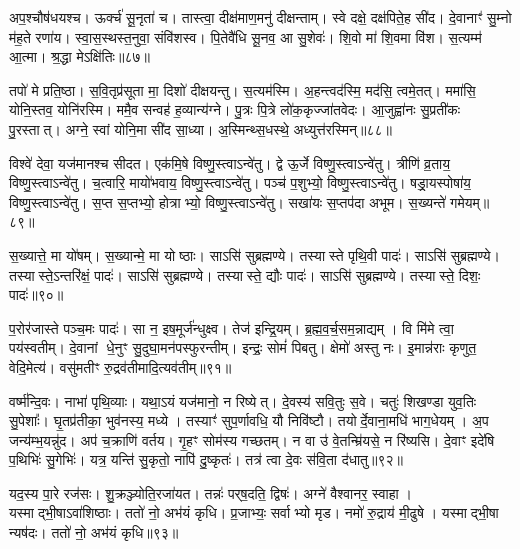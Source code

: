 अप॒श्चौष॑धयश्च।
ऊर्क्च॑ सू॒नृता॑ च।
तास्त्वा॒ दीक्ष॑माण॒मनु॑ दीक्षन्ताम्।
स्वे दक्षे॒ दक्ष॑पिते॒ह सी॑द।
दे॒वानाꣳ॑ सु॒म्नो म॑ह॒ते रणा॑य।
स्वा॒स॒स्थस्त॒नुवा॒ संवि॑शस्व।
पि॒तेवै॑धि सू॒नव॒ आ सु॒शेवः॑।
शि॒वो मा॑ शि॒वमा वि॑श।
स॒त्यम्म॑ आ॒त्मा।
श्र॒द्धा मेऽक्षि॑तिः॥८७॥

तपो॑ मे प्रति॒ष्ठा।
स॒वि॒तृप्र॑सूता मा॒ दिशो॑ दीक्षयन्तु।
स॒त्यम॑स्मि।
अ॒हन्त्वद॑स्मि॒ मद॑सि॒ त्वमे॒तत्।
ममा॑सि॒ योनि॒स्तव॒ योनि॑रस्मि।
ममै॒व सन्वह॑ ह॒व्यान्य॑ग्ने।
पु॒त्रः पि॒त्रे लो॑क॒कृज्जा॑तवेदः।
आ॒जुह्वा॑नः सु॒प्रती॑कः पु॒रस्तात्।
अग्ने॒ स्वां योनि॒मा सी॑द सा॒ध्या।
अ॒स्मिन्थ्स॒धस्थे॒ अध्युत्त॑रस्मिन्॥८८॥

विश्वे॑ देवा॒ यज॑मानश्च सीदत।
एक॑मि॒षे विष्णु॒स्त्वा\-ऽन्वे॑तु।
द्वे ऊ॒र्जे विष्णु॒स्त्वा\-ऽन्वे॑तु।
त्रीणि॑ व्र॒ताय॒ विष्णु॒स्त्वा\-ऽन्वे॑तु।
च॒त्वारि॒ मायो॑भवाय॒ विष्णु॒स्त्वा\-ऽन्वे॑तु।
पञ्च॑ प॒शुभ्यो॒ विष्णु॒स्त्वा\-ऽन्वे॑तु।
षड्रा॒यस्पोषा॑य॒ विष्णु॒स्त्वा\-ऽन्वे॑तु।
स॒प्त स॒प्तभ्यो॒ होत्राभ्यो॒ विष्णु॒स्त्वा\-ऽन्वे॑तु।
सखा॑यः स॒प्तप॑दा अभूम।
स॒ख्यन्ते॑ गमेयम्॥८९॥

स॒ख्यात्ते॒ मा यो॑षम्।
स॒ख्यान्मे॒ मा योष्ठाः।
साऽसि॑ सुब्रह्मण्ये।
तस्यास्ते पृथि॒वी पादः॑।
साऽसि॑ सुब्रह्मण्ये।
तस्यास्ते॒\-ऽन्तरि॑क्षं॒ पादः॑।
साऽसि॑ सुब्रह्मण्ये।
तस्यास्ते॒ द्यौः पादः॑।
साऽसि॑ सुब्रह्मण्ये।
तस्यास्ते॒ दिशः॒ पादः॑॥९०॥

प॒रोर॑जास्ते पञ्च॒मः पादः॑।
सा न॒ इष॒मूर्ज॑न्धुक्ष्व।
तेज॑ इन्द्रि॒यम्।
ब्र॒ह्म॒व॒र्च॒सम॒न्नाद्यम्।
वि मि॑मे त्वा॒ पय॑स्वतीम्।
दे॒वानां धे॒नुꣳ सु॒दुघा॒मन॑पस्फुरन्तीम्।
इन्द्रः॒ सोमं॑ पिबतु।
क्षेमो॑ अस्तु नः।
इ॒मान्न॑राः कृणुत॒ वेदि॒मेत्य॑।
वसु॑मतीꣳ रु॒द्रव॑तीमादि॒त्यव॑तीम्॥९१॥

वर्ष्म॑न्दि॒वः।
नाभा॑ पृथि॒व्याः।
यथा॒ऽयं यज॑मानो॒ न रिष्येत्।
दे॒वस्य॑ सवि॒तुः स॒वे।
चतुः॑ शिखण्डा युव॒तिः सु॒पेशाः᳚।
घृ॒तप्र॑तीका॒ भुव॑नस्य॒ मध्ये।
तस्याꣳ॑ सुप॒र्णावधि॒ यौ निवि॑ष्टौ।
तयोर्दे॒वाना॒मधि॑ भाग॒धेयम्।
अ॒प जन्य॑म्भ॒यन्नु॑द।
अप॑ च॒क्राणि॑ वर्तय।
गृ॒हꣳ सोम॑स्य गच्छतम्।
न वा उ॑ वे॒तन्म्रि॑यसे॒ न रि॑ष्यसि।
दे॒वाꣳ इदे॑षि प॒थिभिः॑ सु॒गेभिः॑।
यत्र॒ यन्ति॑ सु॒कृतो॒ नापि॑ दु॒ष्कृतः॑।
तत्र॑ त्वा दे॒वः स॑वि॒ता द॑धातु॥९२॥

यद॒स्य पा॒रे रज॑सः।
शु॒क्रञ्ज्योति॒रजा॑यत।
तन्नः॑ पर्‌\mbox{}ष॒दति॒ द्विषः॑।
अग्ने॑ वैश्वानर॒ स्वाहा।
यस्माद्भी॒षा\-ऽवा॑शिष्ठाः।
ततो॑ नो॒ अभ॑यं कृधि।
प्र॒जाभ्यः॒ सर्वाभ्यो मृड।
नमो॑ रु॒द्राय॑ मी॒ढुषे।
यस्माद्भी॒षा न्यष॑दः।
ततो॑ नो॒ अभ॑यं कृधि॥९३॥

